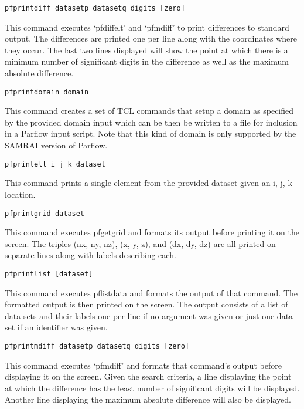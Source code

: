 \begin{description}
\item{\begin{verbatim}pfprintdiff datasetp datasetq digits [zero]\end{verbatim}}
This command executes `pfdiffelt' and `pfmdiff' to print differences
to standard output.  The differences are printed one per line along
with the coordinates where they occur.  The last two lines displayed
will show the point at which there is a minimum number of significant
digits in the difference as well as the maximum absolute difference.


\item{\begin{verbatim}pfprintdomain domain\end{verbatim}} This command
 creates a set of TCL commands that setup a domain as specified by the
 provided domain input which can be then be written to a file for
 inclusion in a Parflow input script.  Note that this kind of domain
 is only supported by the SAMRAI version of Parflow.

\item{\begin{verbatim}pfprintelt i j k dataset\end{verbatim}}
This command prints a single element from the provided dataset given an i, j, k location.

\item{\begin{verbatim}pfprintgrid dataset\end{verbatim}}
This command executes pfgetgrid and formats its output before printing
it on the screen.  The triples (nx, ny, nz), (x, y, z), and
(dx, dy, dz) are all printed on separate lines along with labels
describing each.


\item{\begin{verbatim}pfprintlist [dataset]\end{verbatim}}
This command executes pflistdata and formats the output of that
command.  The formatted output is then printed on the screen.  The
output consists of a list of data sets and their labels one per line
if no argument was given or just one data set if an identifier was
given.


\item{\begin{verbatim}pfprintmdiff datasetp datasetq digits [zero]\end{verbatim}}
This command executes `pfmdiff' and formats that command's output
before displaying it on the screen.  Given the search criteria, a line
displaying the point at which the difference has the least number of
significant digits will be displayed.  Another line displaying the
maximum absolute difference will also be displayed.



\end{description}
